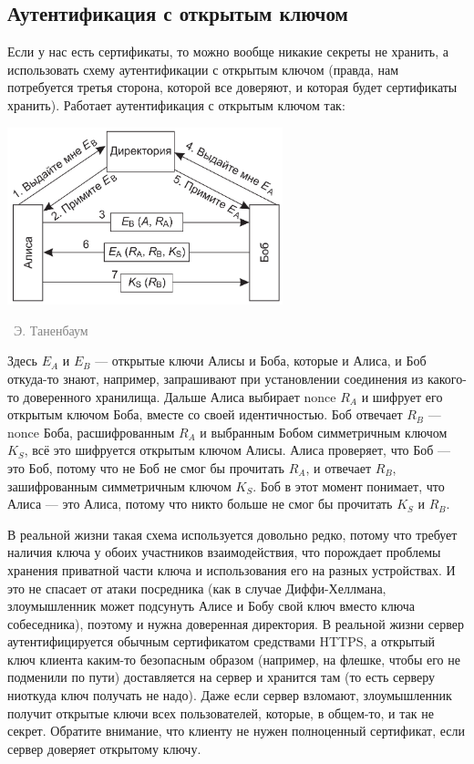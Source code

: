 \documentclass[a5paper]{article}
\newcommand{\attribution}[1] {
\vspace{-5mm}\begin{flushright}\begin{scriptsize}\textcolor{gray}{\textcopyright\, #1}\end{scriptsize}\end{flushright}
}
\begin{document}
\subsection{Аутентификация с открытым ключом}

Если у нас есть сертификаты, то можно вообще никакие секреты не хранить, а использовать схему аутентификации с открытым ключом (правда, нам потребуется третья сторона, которой все доверяют, и которая будет сертификаты хранить). Работает аутентификация с открытым ключом так:

\begin{center}
    \includegraphics[width=0.6\textwidth]{openKeyAuthentication.png}
    \attribution{Э. Таненбаум}
\end{center}

Здесь $E_A$ и $E_B$ --- открытые ключи Алисы и Боба, которые и Алиса, и Боб откуда-то знают, например, запрашивают при установлении соединения из какого-то доверенного хранилища. Дальше Алиса выбирает nonce $R_A$ и шифрует его открытым ключом Боба, вместе со своей идентичностью. Боб отвечает $R_B$ --- nonce Боба, расшифрованным $R_A$ и выбранным Бобом симметричным ключом $K_S$, всё это шифруется открытым ключом Алисы. Алиса проверяет, что Боб --- это Боб, потому что не Боб не смог бы прочитать $R_A$, и отвечает $R_B$, зашифрованным симметричным ключом $K_S$. Боб в этот момент понимает, что Алиса --- это Алиса, потому что никто больше не смог бы прочитать $K_S$ и $R_B$.

В реальной жизни такая схема используется довольно редко, потому что требует наличия ключа у обоих участников взаимодействия, что порождает проблемы хранения приватной части ключа и использования его на разных устройствах. И это не спасает от атаки посредника (как в случае Диффи-Хеллмана, злоумышленник может подсунуть Алисе и Бобу свой ключ вместо ключа собеседника), поэтому и нужна доверенная директория. В реальной жизни сервер аутентифицируется обычным сертификатом средствами HTTPS, а открытый ключ клиента каким-то безопасным образом (например, на флешке, чтобы его не подменили по пути) доставляется на сервер и хранится там (то есть серверу ниоткуда ключ получать не надо). Даже если сервер взломают, злоумышленник получит открытые ключи всех пользователей, которые, в общем-то, и так не секрет. Обратите внимание, что клиенту не нужен полноценный сертификат, если сервер доверяет открытому ключу.
\end{document}
